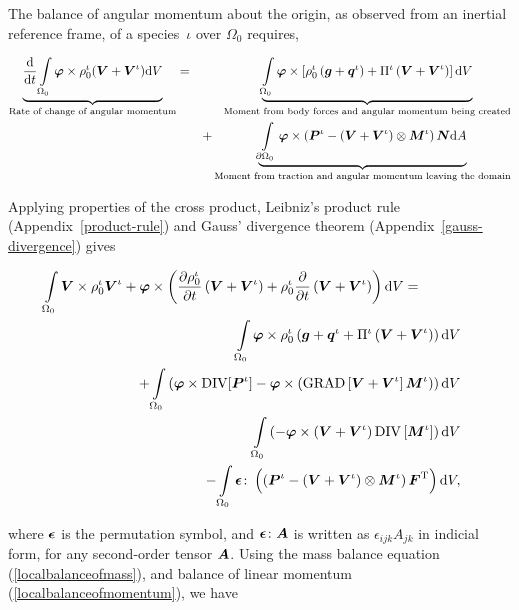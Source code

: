 The balance of angular momentum about the origin, as observed from an
inertial reference frame, of a species~$\iota$ over $\Omega_{0}$
requires,

\begin{eqnarray}
\underbrace{\frac{\mathrm{d}}{\mathrm{d}t} \int\limits_{\Omega_0}
  \mbox{\boldmath$\varphi$} \times \rho^\iota_0(\mbox{\boldmath$ V$}+\mbox{\boldmath$ V$}^\iota)\mathrm{d}V}_{\text{Rate
    of change of angular momentum}} &=&
\underbrace{\int\limits_{\Omega_0}\mbox{\boldmath$\varphi$}\times\left
  [\rho^\iota_0\left(\mbox{\boldmath$ g$}+\mbox{\boldmath$ q$}^\iota\right) +
    \Pi^\iota\left(\mbox{\boldmath$ V$}+\mbox{\boldmath$ V$}^\iota\right)\right]\mathrm{d}V}_{\text{Moment
    from body forces and angular momentum being created}}
\nonumber\\ & &+ \underbrace{
  \int\limits_{\partial\Omega_0}\mbox{\boldmath$\varphi$}\times\left(\mbox{\boldmath$ P$}^\iota -
  \left(\mbox{\boldmath$ V$}+\mbox{\boldmath$ V$}^\iota\right)\otimes\mbox{\boldmath$ M$}^\iota\right)\mbox{\boldmath$ N$}
  \mathrm{d}A}_{\text{Moment from traction and angular momentum
    leaving the domain}}
\label{globalbalanceofangularmomentum}
\end{eqnarray}

\noindent Applying properties of the cross product, Leibniz's product
rule (Appendix~\ref{product-rule}) and Gauss' divergence theorem
(Appendix~\ref{gauss-divergence}) gives

\begin{eqnarray}
\int\limits_{\Omega_0}\mbox{\boldmath$ V$}\times\rho^\iota_0\mbox{\boldmath$ V$}^\iota + \mbox{\boldmath$\varphi$}\times
\left(\frac{\partial\rho^\iota_0}{\partial
  t}\left(\mbox{\boldmath$ V$}+\mbox{\boldmath$ V$}^\iota\right)+ \rho^\iota_0\frac{\partial} {\partial
  t}\left(\mbox{\boldmath$ V$}+\mbox{\boldmath$ V$}^\iota\right)\right)\mathrm{d}V =\qquad\quad&
&\nonumber\\ \int\limits_{\Omega_0}\mbox{\boldmath$\varphi$}\times\rho^\iota_0
\left(\mbox{\boldmath$ g$}+\mbox{\boldmath$ q$}^\iota+\Pi^\iota\left(\mbox{\boldmath$ V$}+\mbox{\boldmath$ V$}^\iota\right)\right)
\mathrm{d}V& &\nonumber\\ +
\int\limits_{\Omega_0}\left(\mbox{\boldmath$\varphi$}\times\mathrm{DIV}[\mbox{\boldmath$ P$}^\iota] -
\mbox{\boldmath$\varphi$}\times\left(\mathrm{GRAD}
\left[\mbox{\boldmath$ V$}+\mbox{\boldmath$ V$}^\iota\right]\mbox{\boldmath$ M$}^\iota\right)\right)\mathrm{d}V &
&\nonumber\\ \int\limits_{\Omega_0}
\left(-\mbox{\boldmath$\varphi$}\times\left(\mbox{\boldmath$ V$}+\mbox{\boldmath$ V$}^\iota\right)
\mathrm{DIV}\left[\mbox{\boldmath$ M$}^\iota\right]\right) \mathrm{d}V & &\nonumber\\ -
\int\limits_{\Omega_0}\mbox{\boldmath$\epsilon$}\colon\left(\left(\mbox{\boldmath$ P$}^\iota -
\left(\mbox{\boldmath$ V$}+\mbox{\boldmath$ V$}^\iota\right) \otimes\mbox{\boldmath$ M$}^\iota\right)
\mbox{\boldmath$ F$}^\mathrm{T}\right) \mathrm{d}V,\nonumber
\end{eqnarray}

\noindent where $\mbox{\boldmath$\epsilon$}$ is the permutation symbol, and
$\mbox{\boldmath$\epsilon$}\colon\mbox{\boldmath$ A$}$ is written as $\epsilon_{ijk}A_{jk}$ in indicial
form, for any second-order tensor $\mbox{\boldmath$ A$}$. Using the mass balance
equation (\ref{localbalanceofmass}), and balance of linear momentum
(\ref{localbalanceofmomentum}), we have

